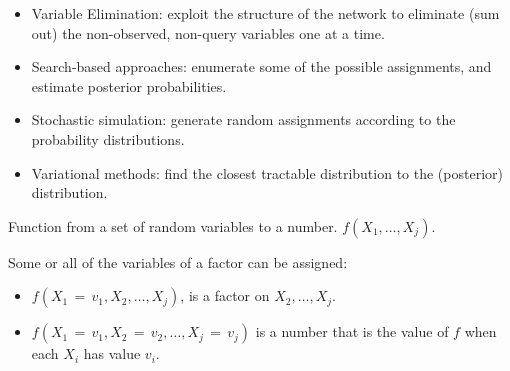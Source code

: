 \documentclass[12pt]{beamer} %
\newcommand{\figdir}{../../figures/ch06}
\begin{document}
\newcommand{\smeq}{\,{=}\,}

\begin{slide}
\begin{itemize}
\item Variable Elimination: exploit the structure of the network to eliminate (sum out) the
non-observed, non-query variables one at a time.
\item Search-based approaches: enumerate some of the
possible assignments, and estimate posterior probabilities.
\item Stochastic simulation: generate random assignments according to the probability distributions.
\item Variational methods: find the closest tractable
  distribution to the (posterior) distribution.
\end{itemize}
\end{slide}



\begin{slide}
Function from
a set of random variables to a number. $f(X_1,\ldots,X_j)$.

Some or all of the variables of a factor can be assigned:
\begin{itemize}
\item
$f(X_1{\smeq}v_1,X_2,\ldots,X_j)$,
is a factor on
$X_2,\ldots,X_j$.
\item 
$f(X_1{\smeq}v_1,X_2{\smeq}v_2,\ldots,X_j{\smeq}v_j)$  is a number that is the value of $f$ when each
$X_i$ has value $v_i$. 
\end{itemize}
\end{slide}
\end{document}
